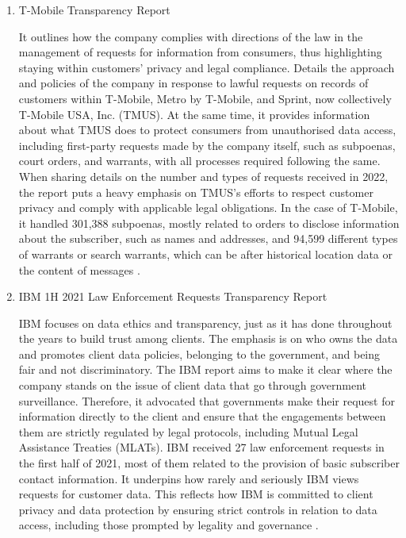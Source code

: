 \begin{enumerate}
\item  T-Mobile Transparency Report

It outlines how the company complies with directions of the law in the management of requests for information from consumers, thus highlighting staying within customers' privacy and legal compliance. Details the approach and policies of the company in response to lawful requests on records of customers within T-Mobile, Metro by T-Mobile, and Sprint, now collectively T-Mobile USA, Inc. (TMUS). At the same time, it provides information about what TMUS does to protect consumers from unauthorised data access, including first-party requests made by the company itself, such as subpoenas, court orders, and warrants, with all processes required following the same. When sharing details on the number and types of requests received in 2022, the report puts a heavy emphasis on TMUS's efforts to respect customer privacy and comply with applicable legal obligations. In the case of T-Mobile, it handled 301,388 subpoenas, mostly related to orders to disclose information about the subscriber, such as names and addresses, and 94,599 different types of warrants or search warrants, which can be after historical location data or the content of messages \cite{TMobile2022TransparencyReport}.
\vspace{15px}

\item IBM 1H 2021 Law Enforcement Requests Transparency Report
 
 IBM focuses on data ethics and transparency, just as it has done throughout the years to build trust among clients. The emphasis is on who owns the data and promotes client data policies, belonging to the government, and being fair and not discriminatory. The IBM report aims to make it clear where the company stands on the issue of client data that go through government surveillance. Therefore, it advocated that governments make their request for information directly to the client and ensure that the engagements between them are strictly regulated by legal protocols, including Mutual Legal Assistance Treaties (MLATs). IBM received 27 law enforcement requests in the first half of 2021, most of them related to the provision of basic subscriber contact information. It underpins how rarely and seriously IBM views requests for customer data. This reflects how IBM is committed to client privacy and data protection by ensuring strict controls in relation to data access, including those prompted by legality and governance \cite{IBMTransparencyReport2023}.


\end{enumerate}
